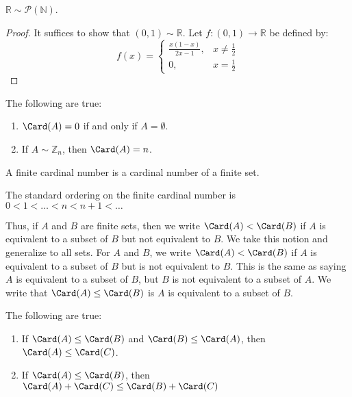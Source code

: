     \begin{theorem}
        $\mathbb{R}\sim\mathcal{P}(\mathbb{N})$.
    \end{theorem}
    \begin{proof}
        It suffices to show that $(0,1)\sim\mathbb{R}$.
        Let $f:(0,1)\rightarrow\mathbb{R}$ be defined by:
        \begin{equation}
            f(x)=
            \begin{cases}
                \frac{x(1-x)}{2x-1},&x\ne\frac{1}{2}\\
                0,&x=\frac{1}{2}
            \end{cases}
        \end{equation}
    \end{proof}
    \begin{theorem}
        The following are true:
        \begin{enumerate}
            \item $\Card(A)=0$ if and only if $A=\emptyset$.
            \item If ${A}\sim{\mathbb{Z}_{n}}$, then $\Card(A)=n$.
        \end{enumerate}
    \end{theorem}
    \begin{definition}
        A finite cardinal number is a cardinal
        number of a finite set.
    \end{definition}
    \begin{definition}
        The standard ordering on the finite cardinal
        number is $0<1<\hdots<n<n+1<\hdots$
    \end{definition}
    Thus, if $A$ and $B$ are finite sets, then we write $\Card(A)<\Card(B)$ if
    $A$ is equivalent to a subset of $B$ but not equivalent to $B$. We take this
    notion and generalize to all sets. For $A$ and $B$, we write
    $\Card(A)<\Card(B)$ if $A$ is equivalent to a subset of $B$ but is not
    equivalent to $B$. This is the same as saying $A$ is equivalent to a subset
    of $B$, but $B$ is not equivalent to a subset of $A$. We write that
    $\Card(A)\leq\Card(B)$ is $A$ is equivalent to a subset of $B$.
    \begin{theorem}
        The following are true:
        \begin{enumerate}
            \item If $\Card(A)\leq\Card(B)$ and
                  $\Card(B)\leq\Card(A)$, then
                  $\Card(A)\leq\Card(C)$.
            \item If $\Card(A)\leq\Card(B)$, then
                  $\Card(A)+\Card(C)\leq\Card(B)+\Card(C)$
        \end{enumerate}
    \end{theorem}
